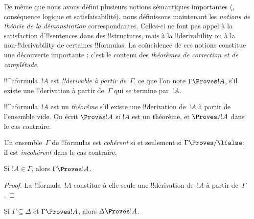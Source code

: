 \documentclass[../../../include/open-logic-section]{subfiles}
\begin{document}
      {}
      {}


\begin{explain}
De même que nous avons défini plusieurs notions sémantiques importantes
(, conséquence logique et
satisfaisabilité), nous définissons maintenant les \emph{notions de
théorie de la démonstration} correspondantes. Celles-ci ne font pas
appel à la satisfaction d'!!{sentence}s dans des !!{structure}s, mais
à la !!{derivability} ou à la non-!!{derivability} de certaines
!!{formula}s. La coïncidence de ces notions constitue une découverte
importante : c'est le contenu des \emph{théorèmes de correction et de
complétude}.
\end{explain}

\begin{defn}[!!^{derivability}]
!!^a{formula}~$!A$ est \emph{!!{derivable} à partir de~$\Gamma$}, ce
que l'on note $\Gamma \Proves !A$, s'il existe une !!{derivation} à
partir de~$\Gamma$ qui se termine par~$!A$.
\end{defn}

\begin{defn}[Théorèmes]
!!^a{formula}~$!A$ est un \emph{théorème} s'il existe une
!!{derivation} de~$!A$ à partir de l'ensemble vide. On écrit
$\Proves !A$ si $!A$ est un théorème, et $\Proves/ !A$ dans le cas
contraire.
\end{defn}

\begin{defn}[Cohérence]
Un ensemble~$\Gamma$ de !!{formula}s est \emph{cohérent} si et seulement
si $\Gamma \Proves/ \lfalse$; il est \emph{incohérent} dans le cas
contraire.
\end{defn}

\begin{prop}[Réflexivité]
Si $!A \in \Gamma$, alors $\Gamma \Proves !A$.
\end{prop}

\begin{proof}
La !!{formula}~$!A$ constitue à elle seule une !!{derivation} de~$!A$
à partir de~$\Gamma$.
\end{proof}

\begin{prop}[Monotonie]
Si $\Gamma \subseteq \Delta$ et $\Gamma \Proves !A$, alors
$\Delta \Proves !A$.
\end{prop}
\end{document}
